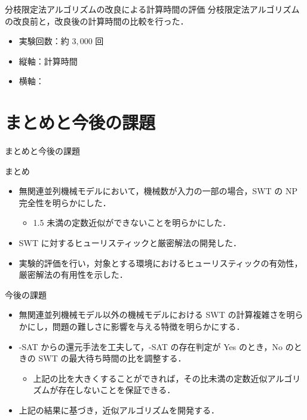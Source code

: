 \documentclass[dvipdfmx]{beamer}
\begin{document}
    \begin{frame}{分枝限定法アルゴリズムの改良による計算時間の評価}
      分枝限定法アルゴリズムの改良前と，改良後の計算時間の比較を行った．
      \begin{itemize}
        \item 実験回数：約 $3,000$ 回
        \item 縦軸：計算時間
        \item 横軸：
      \end{itemize}

    \end{frame}
    \section{まとめと今後の課題}
    \begin{frame}{まとめと今後の課題}
      \begin{block}{まとめ}
        \begin{itemize}
          \item 無関連並列機械モデルにおいて，機械数が入力の一部の場合，SWT の NP 完全性を明らかにした．
          \begin{itemize}
            \item 1.5 未満の定数近似ができないことを明らかにした．
          \end{itemize}
          \item SWT に対するヒューリスティックと厳密解法の開発した．
          \item 実験的評価を行い，対象とする環境におけるヒューリスティックの有効性，厳密解法の有用性を示した．
        \end{itemize}
      \end{block}
      \begin{alertblock}{今後の課題}
        \begin{itemize}
          \item 無関連並列機械モデル以外の機械モデルにおける SWT の計算複雑さを明らかにし，問題の難しさに影響を与える特徴を明らかにする．
          \item {-SAT} からの還元手法を工夫して，{-SAT} の存在判定が Yes のとき，No のときの SWT の最大待ち時間の比を調整する．
          \begin{itemize}
            \item 上記の比を大きくすることができれば，その比未満の定数近似アルゴリズムが存在しないことを保証できる．
          \end{itemize}
          \item 上記の結果に基づき，近似アルゴリズムを開発する．
        \end{itemize}
      \end{alertblock}
    \end{frame}
\end{document}
